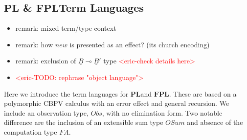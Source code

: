 \documentclass[acmsmall]{acmart}
\newcommand{\eric}[1]{\textcolor{red}{ <eric-#1> }}
\newcommand{\pl}{$\mathbf{PL}$}
\newcommand{\fpl}{$\mathbf{FPL}$}
\begin{document}
\subsection{\pl \; \& \fpl \;Term Languages}\label{sec:ObjLang}
\begin{itemize}
  \item remark: mixed term/type context
  \item remark: how $new$ is presented as an effect? (its church encoding)
  \item remark: exclusion of $\underline{B} \multimap \underline{B}' $ 
  type \eric{check details here}

  \item \eric{TODO: rephrase "object language"}
\end{itemize}

Here we introduce the term languages for \pl \;and \fpl. These are based on a polymorphic CBPV calculus with an error effect and general recursion. We include an observation type, $Obs$, with no elimination form. Two notable difference are the inclusion of an extensible sum type $OSum$ and absence of the computation type $FA$.
\end{document}
